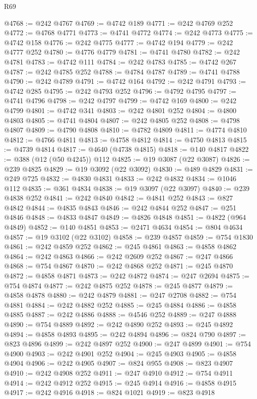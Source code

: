 \begin{lexlean}{R69}
\begin{coremodule}
{@4768 := @242 @4767
@4769 := @4742 @189
@4771 := @242 @4769 @252
@4772 := @4768 @4771
@4773 := @4741 @4772
@4774 := @242 @4773
@4775 := @4742 @158
@4776 := @242 @4775
@4777 := @4742 @194
@4779 := @242 @4777 @252
@4780 := @4776 @4779
@4781 := @4741 @4780
@4782 := @242 @4781
@4783 := @4742 @111
@4784 := @242 @4783
@4785 := @4742 @267
@4787 := @242 @4785 @252
@4788 := @4784 @4787
@4789 := @4741 @4788
@4790 := @242 @4789
@4791 := @4742 @164
@4792 := @242 @4791
@4793 := @4742 @285
@4795 := @242 @4793 @252
@4796 := @4792 @4795
@4797 := @4741 @4796
@4798 := @242 @4797
@4799 := @4742 @169
@4800 := @242 @4799
@4801 := @4742 @341
@4803 := @242 @4801 @252
@4804 := @4800 @4803
@4805 := @4741 @4804
@4807 := @242 @4805 @252
@4808 := @4798 @4807
@4809 := @4790 @4808
@4810 := @4782 @4809
@4811 := @4774 @4810
@4812 := @4766 @4811
@4813 := @4758 @4812
@4814 := @4750 @4813
@4815 := @4739 @4814
@4817 := @4640 (@4738 @4815)
@4818 := @140 @4817
@4822 := @388 (@12 (@50 @4245)) @112
@4825 := @19 @3087 (@22 @3087)
@4826 := @239 @4825
@4829 := @19 @3092 (@22 @3092)
@4830 := @489 @4829
@4831 := @249 @725
@4832 := @4830 @4831
@4833 := @242 @4832
@4834 := @1046 @112
@4835 := @361 @4834
@4838 := @19 @3097 (@22 @3097)
@4840 := @239 @4838 @252
@4841 := @242 @4840
@4842 := @4841 @252
@4843 := @827 @4842
@4844 := @4835 @4843
@4846 := @242 @4844 @252
@4847 := @251 @4846
@4848 := @4833 @4847
@4849 := @4826 @4848
@4851 := @4822 (@964 @4849)
@4852 := @140 @4851
@4853 := @2471 @4634
@4854 := @804 @4634
@4857 := @19 @3102 (@22 @3102)
@4858 := @239 @4857
@4859 := @754 @1830
@4861 := @242 @4859 @252
@4862 := @245 @4861
@4863 := @4858 @4862
@4864 := @242 @4863
@4866 := @242 @2609 @252
@4867 := @247 @4866
@4868 := @754 @4867
@4870 := @242 @4868 @252
@4871 := @245 @4870
@4872 := @4858 @4871
@4873 := @242 @4872
@4874 := @247 @2694
@4875 := @754 @4874
@4877 := @242 @4875 @252
@4878 := @245 @4877
@4879 := @4858 @4878
@4880 := @242 @4879
@4881 := @247 @2708
@4882 := @754 @4881
@4884 := @242 @4882 @252
@4885 := @245 @4884
@4886 := @4858 @4885
@4887 := @242 @4886
@4888 := @4546 @252
@4889 := @247 @4888
@4890 := @754 @4889
@4892 := @242 @4890 @252
@4893 := @245 @4892
@4894 := @4858 @4893
@4895 := @242 @4894
@4896 := @824 @790
@4897 := @823 @4896
@4899 := @242 @4897 @252
@4900 := @247 @4899
@4901 := @754 @4900
@4903 := @242 @4901 @252
@4904 := @245 @4903
@4905 := @4858 @4904
@4906 := @242 @4905
@4907 := @824 @955
@4908 := @823 @4907
@4910 := @242 @4908 @252
@4911 := @247 @4910
@4912 := @754 @4911
@4914 := @242 @4912 @252
@4915 := @245 @4914
@4916 := @4858 @4915
@4917 := @242 @4916
@4918 := @824 @1021
@4919 := @823 @4918
}
\end{coremodule}
\end{lexlean}
